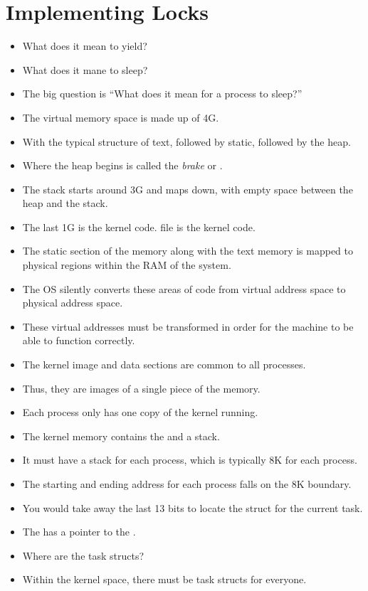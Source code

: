\documentclass[]{article}
\begin{document}
\section{Implementing Locks}
\begin{itemize}
\item What does it mean to yield?
\item What does it mane to sleep?
\item The big question is ``What does it mean for a process to sleep?''
\item The virtual memory space is made up of 4G.
\item With the typical structure of text, followed by static, followed by the
heap.
\item Where the heap begins is called the \emph{brake} or .
\item The stack starts around 3G and maps down, with empty space between the
heap and the stack.
\item The last 1G is the kernel code.  file is the kernel code.
\item The static section of the memory along with the text memory is mapped to
physical regions within the RAM of the system.
\item The OS silently converts these areas of code from virtual address space to
physical address space.
\item These virtual addresses must be transformed in order for the machine to be
able to function correctly.
\item The kernel image and data sections are common to all processes.
\item Thus, they are images of a single piece of the memory.
\item Each process only has one copy of the kernel running.
\item The kernel memory contains the  and a stack.
\item It must have a stack for each process, which is typically 8K for each
process.
\item The starting and ending address for each process falls on the 8K boundary.
\item You would take away the last 13 bits to locate the 
struct for the current task.
\item The  has a pointer to the .
\item Where are the task structs?
\item Within the kernel space, there must be task structs for everyone.

\end{itemize}
\end{document}
